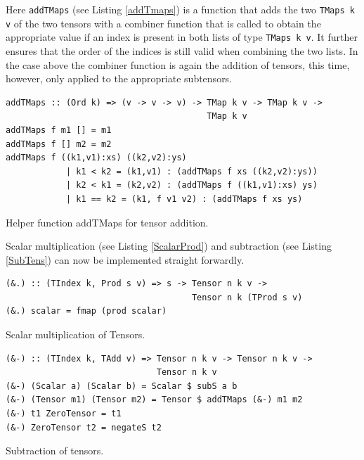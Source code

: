\documentclass[a4paper,12pt, DIV=14, BCOR=5mm, twoside, headsepline, numbers=noenddot]{scrbook}
\begin{document}
Here \texttt{addTMaps} (see Listing \ref{addTmaps}) is a function that adds the two \texttt{TMaps k v} of the two tensors with a combiner function that is called to obtain the appropriate value if an index is present in both lists of type \texttt{TMaps k v}. It further ensures that the order of the indices is still valid when combining the two lists. In the case above the combiner function is again the addition of tensors, this time, however, only applied to the appropriate subtensors. 

\begin{listing}[hbt!] 
\begin{verbatim}
addTMaps :: (Ord k) => (v -> v -> v) -> TMap k v -> TMap k v ->
                                        TMap k v 
addTMaps f m1 [] = m1 
addTMaps f [] m2 = m2 
addTMaps f ((k1,v1):xs) ((k2,v2):ys) 
            | k1 < k2 = (k1,v1) : (addTMaps f xs ((k2,v2):ys))
            | k2 < k1 = (k2,v2) : (addTMaps f ((k1,v1):xs) ys)
            | k1 == k2 = (k1, f v1 v2) : (addTMaps f xs ys) 
\end{verbatim} 
\caption{Helper function addTMaps for tensor addition.}\label{addTmaps}
\end{listing}

Scalar multiplication (see Listing \ref{ScalarProd}) and subtraction (see Listing \ref{SubTens}) can now be implemented straight forwardly.

\begin{listing}[hbt!] 
\begin{verbatim}
(&.) :: (TIndex k, Prod s v) => s -> Tensor n k v ->
                                     Tensor n k (TProd s v)
(&.) scalar = fmap (prod scalar)
\end{verbatim} 
\caption{Scalar multiplication of Tensors.}\label{ScalarProd}
\end{listing}

\begin{listing}[hbt!] 
\begin{verbatim}
(&-) :: (TIndex k, TAdd v) => Tensor n k v -> Tensor n k v ->
                              Tensor n k v
(&-) (Scalar a) (Scalar b) = Scalar $ subS a b
(&-) (Tensor m1) (Tensor m2) = Tensor $ addTMaps (&-) m1 m2
(&-) t1 ZeroTensor = t1
(&-) ZeroTensor t2 = negateS t2
\end{verbatim} 
\caption{Subtraction of tensors.}\label{SubTens}
\end{listing}
\end{document}
